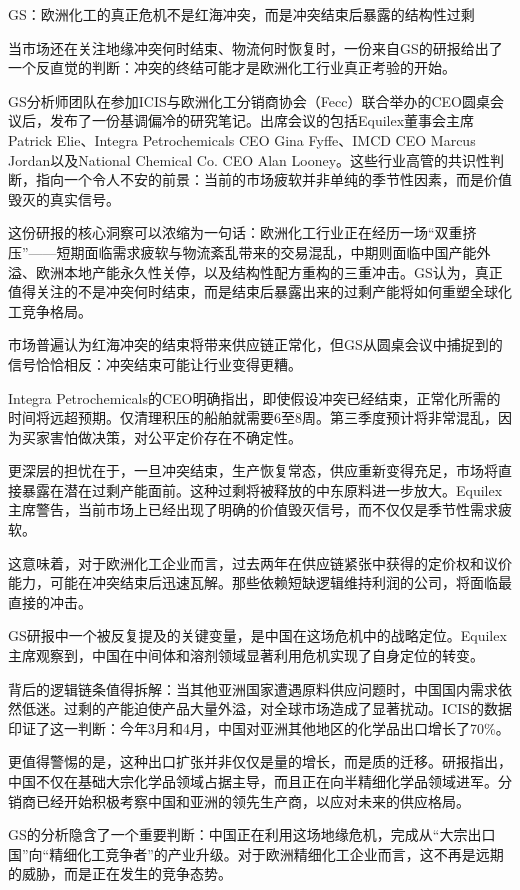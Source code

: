 \documentclass[11pt]{ctexart}
\begin{document}
GS：欧洲化工的真正危机不是红海冲突，而是冲突结束后暴露的结构性过剩

当市场还在关注地缘冲突何时结束、物流何时恢复时，一份来自GS的研报给出了一个反直觉的判断：冲突的终结可能才是欧洲化工行业真正考验的开始。

GS分析师团队在参加ICIS与欧洲化工分销商协会（Fecc）联合举办的CEO圆桌会议后，发布了一份基调偏冷的研究笔记。出席会议的包括Equilex董事会主席Patrick Elie、Integra Petrochemicals CEO Gina Fyffe、IMCD CEO Marcus Jordan以及National Chemical Co. CEO Alan Looney。这些行业高管的共识性判断，指向一个令人不安的前景：当前的市场疲软并非单纯的季节性因素，而是价值毁灭的真实信号。

这份研报的核心洞察可以浓缩为一句话：欧洲化工行业正在经历一场“双重挤压”——短期面临需求疲软与物流紊乱带来的交易混乱，中期则面临中国产能外溢、欧洲本地产能永久性关停，以及结构性配方重构的三重冲击。GS认为，真正值得关注的不是冲突何时结束，而是结束后暴露出来的过剩产能将如何重塑全球化工竞争格局。

市场普遍认为红海冲突的结束将带来供应链正常化，但GS从圆桌会议中捕捉到的信号恰恰相反：冲突结束可能让行业变得更糟。

Integra Petrochemicals的CEO明确指出，即使假设冲突已经结束，正常化所需的时间将远超预期。仅清理积压的船舶就需要6至8周。第三季度预计将非常混乱，因为买家害怕做决策，对公平定价存在不确定性。

更深层的担忧在于，一旦冲突结束，生产恢复常态，供应重新变得充足，市场将直接暴露在潜在过剩产能面前。这种过剩将被释放的中东原料进一步放大。Equilex主席警告，当前市场上已经出现了明确的价值毁灭信号，而不仅仅是季节性需求疲软。

这意味着，对于欧洲化工企业而言，过去两年在供应链紧张中获得的定价权和议价能力，可能在冲突结束后迅速瓦解。那些依赖短缺逻辑维持利润的公司，将面临最直接的冲击。

GS研报中一个被反复提及的关键变量，是中国在这场危机中的战略定位。Equilex主席观察到，中国在中间体和溶剂领域显著利用危机实现了自身定位的转变。

背后的逻辑链条值得拆解：当其他亚洲国家遭遇原料供应问题时，中国国内需求依然低迷。过剩的产能迫使产品大量外溢，对全球市场造成了显著扰动。ICIS的数据印证了这一判断：今年3月和4月，中国对亚洲其他地区的化学品出口增长了70\%。

更值得警惕的是，这种出口扩张并非仅仅是量的增长，而是质的迁移。研报指出，中国不仅在基础大宗化学品领域占据主导，而且正在向半精细化学品领域进军。分销商已经开始积极考察中国和亚洲的领先生产商，以应对未来的供应格局。

GS的分析隐含了一个重要判断：中国正在利用这场地缘危机，完成从“大宗出口国”向“精细化工竞争者”的产业升级。对于欧洲精细化工企业而言，这不再是远期的威胁，而是正在发生的竞争态势。
\end{document}
